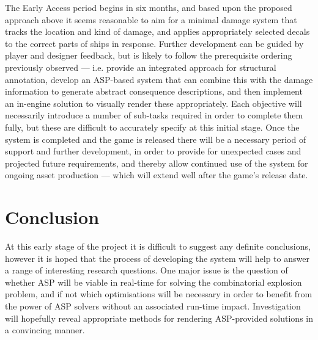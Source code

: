 \documentclass[11pt]{report}
\begin{document}
	The Early Access period begins in six months, and based upon the proposed approach above it seems reasonable to aim for a minimal damage system that tracks the location and kind of damage, and applies appropriately selected decals to the correct parts of ships in response. Further development can be guided by player and designer feedback, but is likely to follow the prerequisite ordering previously observed --- i.e. provide an integrated approach for structural annotation, develop an ASP-based system that can combine this with the damage information to generate abstract consequence descriptions, and then implement an in-engine solution to visually render these appropriately. Each objective will necessarily introduce a number of sub-tasks required in order to complete them fully, but these are difficult to accurately specify at this initial stage. Once the system is completed and the game is released there will be a necessary period of support and further development, in order to provide for unexpected cases and projected future requirements, and thereby allow continued use of the system for ongoing asset production --- which will extend well after the game's release date.

\chapter{Conclusion} \label{chap:conc}
	At this early stage of the project it is difficult to suggest any definite conclusions, however it is hoped that the process of developing the system will help to answer a range of interesting research questions. One major issue is the question of whether ASP will be viable in real-time for solving the combinatorial explosion problem, and if not which optimisations will be necessary in order to benefit from the power of ASP solvers without an associated run-time impact. Investigation will hopefully reveal appropriate methods for rendering ASP-provided solutions in a convincing manner. 





\end{document}
